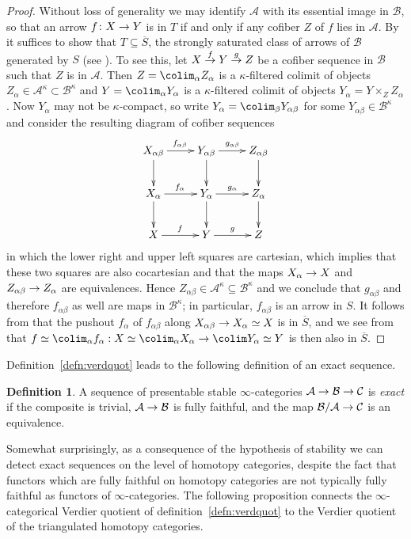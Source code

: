 \documentclass{amsart}
\renewcommand{\to}{\mathchoice{\longrightarrow}{\rightarrow}{\rightarrow}{\rightarrow}}
\let\catsymbfont\mathcal
\newcommand{\aA}{{\catsymbfont{A}}}
\newcommand{\aB}{{\catsymbfont{B}}}
\newcommand{\aC}{{\catsymbfont{C}}}
\renewcommand{\i}{\infty}
\numberwithin{equation}{section}
\theoremstyle{definition}
\newtheorem{definition}[equation]{Definition}
\begin{document}
\begin{proof}
Without loss of generality we may identify $\aA$ with its essential
image in $\aB$, so that an arrow $f\colon X\to Y$ is in $T$ if and only
if any cofiber $Z$ of $f$ lies in $\aA$.  By \cite[5.5.4.15]{HTT} it
suffices to show that $T\subseteq\overline{S}$, the 
strongly saturated class of arrows of $\aB$ generated by $S$
(see \cite[5.5.4.5]{HTT}).
To see this, let $X\overset{f}{\to} Y\overset{g}{\to} Z$ be a cofiber 
sequence in $\aB$ such that $Z$ is in $\aA$.  Then $Z=\colim_\alpha
Z_\alpha$ is a $\kappa$-filtered colimit of objects
$Z_\alpha\in\aA^\kappa\subset\aB^\kappa$ and $Y=\colim_\alpha
Y_\alpha$ is a $\kappa$-filtered colimit of objects
$Y_\alpha=Y\times_Z Z_\alpha$.
Now $Y_\alpha$ may not be $\kappa$-compact, so write
$Y_\alpha=\colim_\beta Y_{\alpha\beta}$ for some
$Y_{\alpha\beta}\in\aB^\kappa$ and consider the resulting diagram of
cofiber sequences 
\[
\xymatrix{
X_{\alpha\beta}\ar[r]^{f_{\alpha\beta}}\ar[d] & Y_{\alpha\beta}\ar[r]^{g_{\alpha\beta}}\ar[d] & Z_{\alpha\beta}\ar[d]\\
X_\alpha\ar[r]^{f_\alpha}\ar[d] & Y_\alpha\ar[r]^{g_\alpha}\ar[d] & Z_\alpha\ar[d]\\
X\ar[r]^f & Y\ar[r]^g & Z}
\]
in which the lower right and upper left squares are cartesian, which
implies that these two squares are also cocartesian and that the maps
$X_\alpha\to X$ and $Z_{\alpha\beta}\to Z_\alpha$ are equivalences.
Hence $Z_{\alpha\beta}\in\aA^\kappa\subseteq\aB^\kappa$ and we
conclude that $g_{\alpha\beta}$ and therefore $f_{\alpha\beta}$ as
well are maps in $\aB^\kappa$; in particular, $f_{\alpha\beta}$ is an
arrow in $S$. 
It follows from \cite[5.5.4.5]{HTT} that the pushout $f_\alpha$ of
$f_{\alpha\beta}$ along $X_{\alpha\beta}\to X_\alpha\simeq X$ is in
$\overline{S}$, and we see from \cite[5.5.4.12]{HTT} that
$f\simeq\colim_\alpha f_\alpha:X\simeq\colim_\alpha X_\alpha\to\colim
Y_\alpha\simeq Y$ is then also in $\overline{S}$.  
\end{proof}

Definition~\ref{defn:verdquot} leads to the following definition of an
exact sequence.

\begin{definition}\label{defn:exact}
A sequence of presentable stable $\i$-categories
$\aA\to\aB\to\aC$ is {\em exact} if the composite is trivial,
$\aA\to\aB$ is fully faithful, and the map $\aB/\aA\to\aC$ is an
equivalence.
\end{definition}

Somewhat surprisingly, as a consequence of the hypothesis of stability
we can detect exact sequences on the level of homotopy categories,
despite the fact that functors which are fully faithful on homotopy
categories are not typically fully faithful as functors of
$\i$-categories.  The following proposition connects the
$\i$-categorical Verdier quotient of definition~\ref{defn:verdquot} to
the Verdier quotient of the triangulated homotopy categories.
\end{document}
